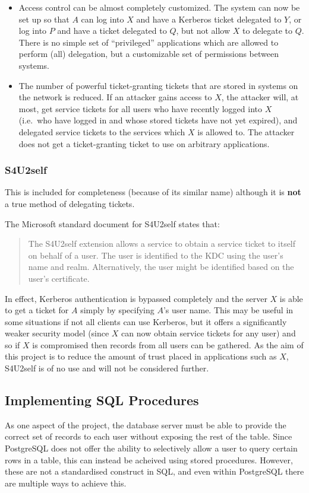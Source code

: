 \documentclass{article}
\begin{document}
\begin{itemize}
\item
  Access control can be almost completely customized. The system can now be set up so that $A$ can log into $X$ and have a Kerberos ticket delegated to $Y$, or log into $P$ and have a ticket delegated to $Q$, but not allow $X$ to delegate to $Q$. There is no simple set of ``privileged'' applications which are allowed to perform (all) delegation, but a customizable set of permissions between systems.
\item
  The number of powerful ticket-granting tickets that are stored in systems on the network is reduced. If an attacker gains access to $X$, the attacker will, at most, get service tickets for all users who have recently logged into $X$ (i.e.\ who have logged in and whose stored tickets have not yet expired), and delegated service tickets to the services which $X$ is allowed to. The attacker does not get a ticket-granting ticket to use on arbitrary applications.
\end{itemize}

\subsubsection{S4U2self}
This is included for completeness (because of its similar name) although it is \textbf{not} a true method of delegating tickets.

The Microsoft standard document for S4U2self\cite{MS-s4u2} states that:

\begin{quote}
  The S4U2self extension allows a service to obtain a service ticket to itself on behalf of a user. The user is identified to the KDC using the user's name and realm. Alternatively, the user might be identified based on the user's certificate.
\end{quote}

In effect, Kerberos authentication is bypassed completely and the server $X$ is able to get a ticket for $A$ simply by specifying $A$'s user name. This may be useful in some situations if not all clients can use Kerberos, but it offers a significantly weaker security model (since $X$ can now obtain service tickets for any user) and so if $X$ is compromised then records from all users can be gathered. As the aim of this project is to reduce the amount of trust placed in applications such as $X$, S4U2self is of no use and will not be considered further.

\subsection{Implementing SQL Procedures}
As one aspect of the project, the database server must be able to provide the correct set of records to each user without exposing the rest of the table. Since PostgreSQL does not offer the ability to selectively allow a user to query certain rows in a table, this can instead be acheived using stored procedures. However, these are not a standardised construct in SQL, and even within PostgreSQL there are multiple ways to achieve this.
\end{document}
